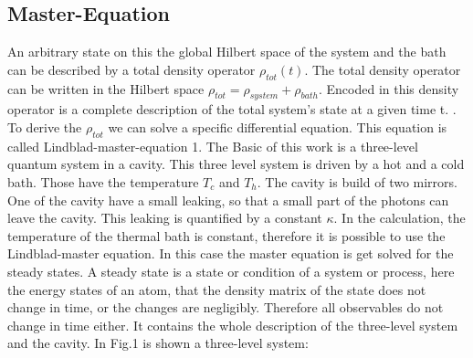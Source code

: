 \documentclass[12pt,a4paper]{article}
\makeatletter
\def\eqref{\@ifstar\@eqref\@@eqref}
\def\@eqref#1{\textup{\tagform@{\ref*{#1}}}}
\def\@@eqref#1{\textup{\tagform@{\ref{#1}}}}
\makeatother
\begin{document}
\subsection{Master-Equation} 
An arbitrary state on this the global Hilbert space of the system and the bath can be described by a total density operator $\rho_{tot}(t)$. The total density operator can be written in the Hilbert space $ \rho_ {tot}= \rho_{system}+\rho_{bath}$.  Encoded in this density 
operator is a complete description of the total system's state at a given time t. \cite{Li2017}. To derive the $\rho_{tot}$ we can solve a specific differential equation. This equation is called Lindblad-master-equation \eqref{1}. 
The Basic of this work is a three-level quantum system in a cavity. This three level system is driven by a hot and a cold bath. Those have the temperature $T_c$ and $T_h$. The cavity is build of two mirrors. One of the cavity have a small leaking, so that a small part of the photons can leave the cavity. This leaking is quantified by a constant $\kappa$.
In the calculation, the temperature of the thermal bath is constant, therefore 
it is possible to use the Lindblad-master equation. 
In this case the master equation is get solved for the steady states.
A steady state is a state or condition of a system or process, here the energy states of an atom, that the density matrix of the state does not change in time, or the changes are negligibly. Therefore all observables do not change in time either. 
It contains the whole description of the three-level system and the cavity.
In Fig.1 is shown a three-level system:
\newpage
\end{document}

